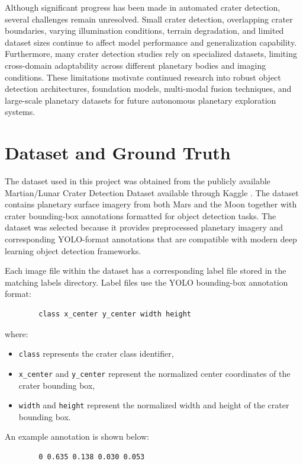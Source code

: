 \documentclass[conference]{IEEEtran}
\begin{document}
	Although significant progress has been made in automated crater detection, several challenges remain unresolved. Small crater detection, overlapping crater boundaries, varying illumination conditions, terrain degradation, and limited dataset sizes continue to affect model performance and generalization capability. Furthermore, many crater detection studies rely on specialized datasets, limiting cross-domain adaptability across different planetary bodies and imaging conditions. These limitations motivate continued research into robust object detection architectures, foundation models, multi-modal fusion techniques, and large-scale planetary datasets for future autonomous planetary exploration systems.
	
	\section{Dataset and Ground Truth}
	
	The dataset used in this project was obtained from the publicly available Martian/Lunar Crater Detection Dataset available through Kaggle \cite{b8}. The dataset contains planetary surface imagery from both Mars and the Moon together with crater bounding-box annotations formatted for object detection tasks. The dataset was selected because it provides preprocessed planetary imagery and corresponding YOLO-format annotations that are compatible with modern deep learning object detection frameworks.
	
	Each image file within the dataset has a corresponding label file stored in the matching labels directory. Label files use the YOLO bounding-box annotation format:
	
	\begin{verbatim}
		class x_center y_center width height
	\end{verbatim}
	
	where:
	\begin{itemize}
		\item \texttt{class} represents the crater class identifier,
		\item \texttt{x\_center} and \texttt{y\_center} represent the normalized center coordinates of the crater bounding box,
		\item \texttt{width} and \texttt{height} represent the normalized width and height of the crater bounding box.
	\end{itemize}
	
	An example annotation is shown below:
	
	\begin{verbatim}
		0 0.635 0.138 0.030 0.053
	\end{verbatim}
	
\end{document}
